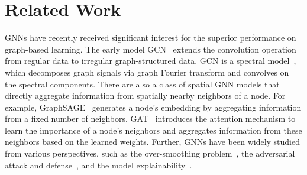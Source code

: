 \documentclass[nohyperref]{article}
\theoremstyle{plain}
\theoremstyle{definition}
\theoremstyle{remark}
\begin{document}
 \section{Related Work}
\label{sec:related}
GNNs have recently received significant interest 
for the superior performance on graph-based learning.
The early model GCN~\cite{kipf2016semi} extends
the convolution operation from regular data to irregular graph-structured data.
GCN is a spectral model~\cite{bruna2013spectral,defferrard2016convolutional}, 
which decomposes graph signals via graph Fourier transform and convolves on the spectral components.
There are also a class of spatial GNN models that directly aggregate information from spatially nearby neighbors of a node.
For example,
GraphSAGE~\cite{hamilton2017inductive} generates a node's embedding by aggregating information from a fixed number of neighbors.
GAT~\cite{velivckovic2017graph} introduces the attention mechanism to learn the importance of a node's neighbors
and aggregates information from these neighbors based on the learned weights.
Further,
GNNs have been widely studied from various perspectives,
such as the over-smoothing problem~\cite{zhao2019pairnorm,rong2019dropedge},
the adversarial attack
and defense~\cite{dai2018adversarial,zhu2019robust},
and the model explainability~\cite{vu2020pgm,shan2021reinforcement}.
\end{document}

